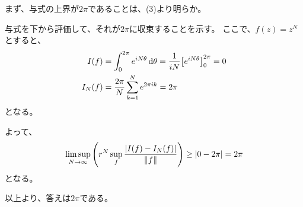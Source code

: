 \documentclass[a4paper, 10pt, dvipdfmx]{jlreq}
\begin{document}
まず、与式の上界が$2\pi$であることは、(3)より明らか。

与式を下から評価して、それが$2\pi$に収束することを示す。
ここで、$f(z)=z^N$とすると、
\begin{align*}
  I(f)   & =\int_0^{2\pi} e^{iN\theta} \dd{\theta} = \frac{1}{iN} \qty[e^{iN\theta}]_0^{2\pi} = 0 \\
  I_N(f) & =\frac{2\pi}{N} \sum_{k=1}^N e^{2\pi i k} = 2\pi
\end{align*}
となる。

よって、
\begin{equation*}
  \limsup_{N \to \infty} \qty(r^N \sup_f \frac{\abs{I(f)-I_N(f)}}{\norm{f}}) \geq  \abs{0-2\pi} = 2\pi
\end{equation*}
となる。

以上より、答えは$2\pi$である。
\end{document}
